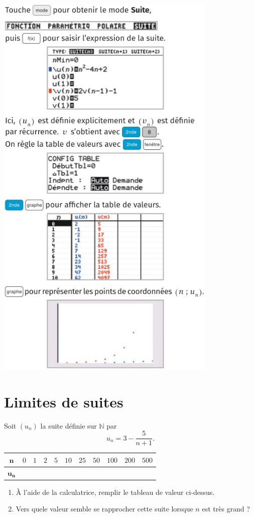 \documentclass[11pt]{article}
\begin{document}
\begin{minipage}{.48\textwidth}
  \begin{center}
    \includegraphics[scale=.6]{calculatrice.png}
  \end{center}
\end{minipage}

\section{Limites de suites}
\begin{app}
  Soit $(u_n)$ la suite définie sur $\mathbb{N}$ par 
  \[
    u_n=3-\frac{5}{n+1}.
  \]
  \begin{center}
  \renewcommand{\arraystretch}{2}
  \begin{tabularx}{\textwidth}{|c|Y|Y|Y|Y|Y|Y|Y|Y|Y|Y|}
   \hline
   $\mathbf{n}$ & $0$ & $1$ & $2$ & $5$ & $10$ & $25$ & $50$ & $100$ & $200$ &
   $500$ \\
   \hline
   $\mathbf{u_n}$ & & & & & & & & & & \\
   \hline
  \end{tabularx}
  \end{center}
  \begin{enumerate}
    \item À l'aide de la calculatrice, remplir le tableau de valeur ci-dessus.
    \item Vers quele valeur semble se rapprocher cette suite lorsque $n$ est
      très grand ?
  \end{enumerate}
\end{app}
\end{document}
